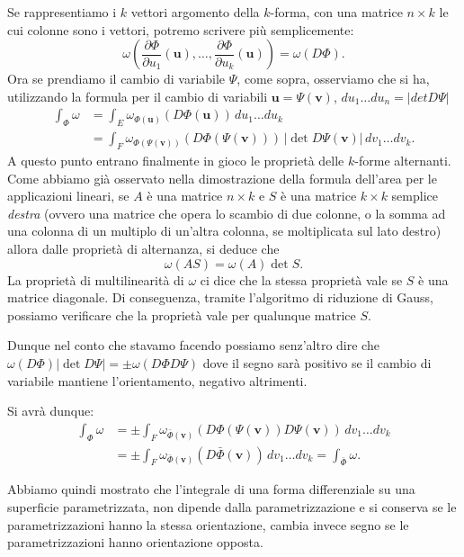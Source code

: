 \documentclass[italian,a4paper]{scrartcl}
\renewcommand{\vec}{\mathbf}
\begin{document}
Se rappresentiamo i $k$ vettori argomento della $k$-forma, con una
matrice $n\times k$ le cui colonne sono i vettori, potremo scrivere
più semplicemente:
\[
  \omega\left(\frac{\partial
  \Phi}{\partial u_1}(\vec u), \dots, \frac{\partial \Phi}{\partial
    u_k}(\vec u)\right)
   = \omega(D\Phi).
\]
Ora se prendiamo il cambio di variabile $\Psi$, come sopra, osserviamo
che si ha, utilizzando la formula per il cambio di variabili $\vec u
= \Psi(\vec v)$, $du_1 \dots du_n = \lvert det D\Psi\rvert$
\begin{align*}
 \int_{\Phi} \omega & = \int_E \omega_{\Phi(\vec u)}(D\Phi(\vec u))\, du_1\dots du_k\\
 &= \int_F \omega_{\Phi(\Psi(\vec v))}(D\Phi(\Psi(\vec v)))\, \lvert
 \det D\Psi(\vec v)\rvert\, dv_1 \dots dv_k.
\end{align*}
A questo punto entrano finalmente in gioco le proprietà delle
$k$-forme alternanti. Come abbiamo già osservato nella dimostrazione
della formula dell'area per le applicazioni lineari, se $A$ è una
matrice $n\times k$ e $S$ è una
matrice $k\times k$ semplice \emph{destra} (ovvero una matrice che opera lo scambio di due
colonne, o la somma ad una colonna di un multiplo di un'altra colonna,
se moltiplicata sul lato destro)
allora dalle proprietà di alternanza, si deduce che
\[
  \omega(A S) = \omega(A)\det S.
\]
La proprietà di multilinearità di $\omega$ ci dice che
la stessa proprietà vale se $S$ è una matrice diagonale. Di
conseguenza, tramite l'algoritmo di riduzione di Gauss, possiamo
verificare che la proprietà vale per qualunque matrice $S$.

Dunque nel conto che stavamo facendo possiamo senz'altro dire che
$\omega(D\Phi)\lvert \det D\Psi\rvert = \pm \omega(D\Phi D\Psi)$ dove
il segno sarà positivo se il cambio di variabile mantiene
l'orientamento, negativo altrimenti.

Si avrà dunque:
\begin{align*}
\int_\Phi \omega
&= \pm \int_F \omega_{\bar \Phi(\vec v)} (D\Phi(\Psi(\vec
v))D\Psi(\vec v))\, dv_1\dots dv_k \\
& = \pm \int_F \omega_{\bar \Phi(\vec v)} (D\bar \Phi(\vec v))\,
dv_1\dots dv_k
= \int_{\bar \Phi} \omega.
\end{align*}

Abbiamo quindi mostrato che l'integrale di una forma differenziale su
una superficie parametrizzata, non dipende dalla parametrizzazione e
si conserva se le parametrizzazioni hanno la stessa orientazione,
cambia invece segno se le parametrizzazioni hanno orientazione opposta.
\end{document}
